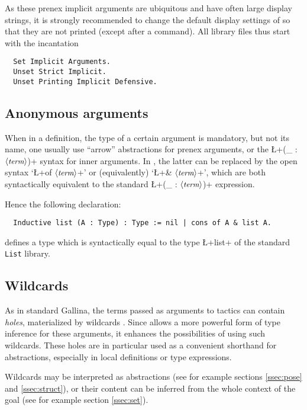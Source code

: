 As these prenex implicit arguments are ubiquitous and have often large
display strings, it is strongly recommended to change the default
display settings of \Coq{} so that they are not printed (except after a
 command).
All \ssr{} library files thus start with the incantation
\begin{lstlisting}
  Set Implicit Arguments.
  Unset Strict Implicit.
  Unset Printing Implicit Defensive.
\end{lstlisting}

\subsection{Anonymous arguments}
When in a definition, the type of a certain argument is mandatory, but
not its name, one usually use ``arrow'' abstractions for prenex
arguments, or the \L+(_ : $\langle\mbox{\itshape\rmfamily\small term}\rangle$)+ syntax for inner arguments.
In \ssr{}, the latter can be replaced by the open syntax `\L+of $\langle\mbox{\itshape\rmfamily\small term}\rangle$+'
or (equivalently)  `\L+& $\langle\mbox{\itshape\rmfamily\small term}\rangle$+', which are both syntactically
equivalent to the standard \Coq{} \L+(_ : $\langle\mbox{\itshape\rmfamily\small term}\rangle$)+ expression.

Hence the following declaration:
\begin{lstlisting}
  Inductive list (A : Type) : Type := nil | cons of A & list A.
\end{lstlisting}
defines a type which is syntactically equal to the type \L+list+ of
the \Coq{} standard {\tt List} library.


\subsection{Wildcards}\label{ssec:wild}

As in standard Gallina, the terms passed as arguments
to \ssr{} tactics can contain \emph{holes}, materialized by wildcards
\C{_}.
Since \ssr{} allows a more powerful form of type inference for these
arguments, it enhances the possibilities of using such wildcards.
These holes are in particular used as a convenient shorthand for
abstractions, especially in local definitions or type expressions.

Wildcards may be interpreted as abstractions (see for example sections
\ref{ssec:pose} and \ref{ssec:struct}), or their content can be
inferred from the whole
context of the goal (see for example section \ref{ssec:set}).
